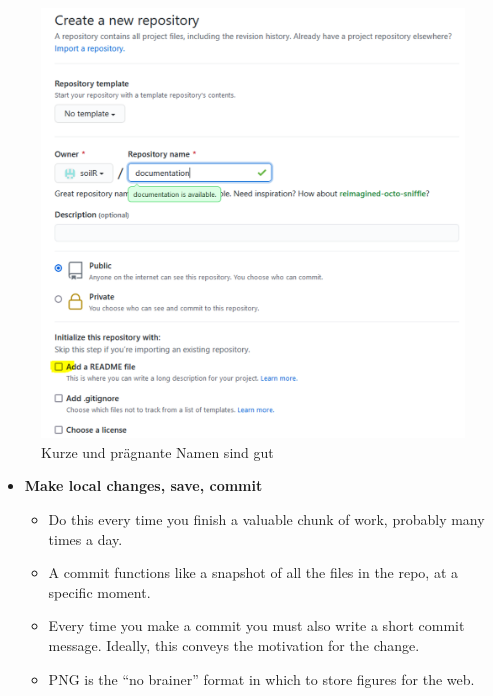 \documentclass[
]{article}
\providecommand{\tightlist}{%
  \setlength{\itemsep}{0pt}\setlength{\parskip}{0pt}}
\begin{document}
\begin{figure}

{\centering \includegraphics[width=11.18in]{images/067} 

}

\caption{Kurze und prägnante Namen sind gut}\label{fig:unnamed-chunk-294}
\end{figure}

\begin{itemize}
\item
  \textbf{Make local changes, save, commit}

  \begin{itemize}
  \tightlist
  \item
    Do this every time you finish a valuable chunk of work, probably
    many times a day.
  \item
    A commit functions like a snapshot of all the files in the repo,
    at a specific moment.
  \item
    Every time you make a commit you must also write a short commit
    message. Ideally, this conveys the motivation for the change.
  \item
    PNG is the ``no brainer'' format in which to store figures for the
    web.
  \end{itemize}
\end{itemize}
\end{document}
